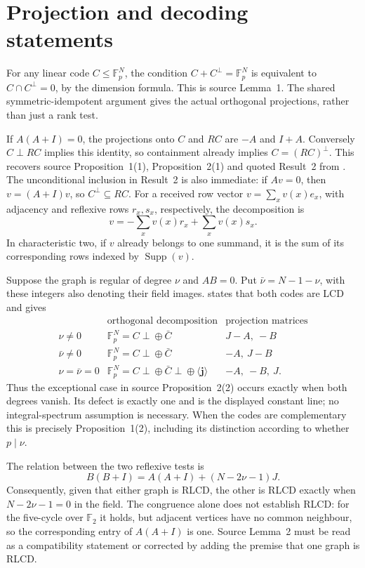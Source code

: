 \section{Projection and decoding statements}
For any linear code $C\leq\mathbb F_p^N$, the condition
$C+C^\perp=\mathbb F_p^N$ is equivalent to $C\cap C^\perp=0$, by the
dimension formula. This is source Lemma~1. The shared symmetric-idempotent
argument gives the actual orthogonal projections, rather than just a
rank test.

If $A(A+I)=0$, the projections onto $C$ and $RC$ are $-A$ and $I+A$.
Conversely $C\perp RC$ implies this identity, so containment already
implies $C=(RC)^\perp$. This recovers source Proposition~1(1),
Proposition~2(1) and quoted Result~2 from .
The unconditional inclusion in Result~2 is also immediate:
if $Av=0$, then $v=(A+I)v$, so $C^\perp\subseteq RC$.
For a received row vector $v=\sum_xv(x)e_x$, with adjacency and reflexive
rows $r_x,s_x$, respectively, the decomposition is
\[
 v=-\sum_xv(x)r_x+\sum_xv(x)s_x.
\]
In characteristic two, if $v$ already belongs to one summand, it is the
sum of its corresponding rows indexed by $\operatorname{Supp}(v)$.

Suppose the graph is regular of degree $\nu$ and $AB=0$.
Put $\bar\nu=N-1-\nu$, with these integers also denoting their field
images.  states that both codes are LCD and gives
\[
\begin{array}{c|c|c}
 &\text{orthogonal decomposition}&\text{projection matrices}\\\hline
\nu\ne0&\mathbb F_p^N=C\perp\!\oplus\bar C&J-A,\ -B\\
\bar\nu\ne0&\mathbb F_p^N=C\perp\!\oplus\bar C&-A,\ J-B\\
\nu=\bar\nu=0&\mathbb F_p^N=C\perp\!\oplus\bar C\perp\!\oplus\langle\mathbf j\rangle
 &-A,\ -B,\ J.
\end{array}
\]
Thus the exceptional case in source Proposition~2(2) occurs exactly when
both degrees vanish. Its defect is exactly one and is the displayed
constant line; no integral-spectrum assumption is necessary. When the
codes are complementary this is precisely Proposition~1(2), including
its distinction according to whether $p\mid\nu$.

The relation between the two reflexive tests is
\begin{equation}\label{eq:two-reflexive}
 B(B+I)=A(A+I)+(N-2\nu-1)J.
\end{equation}
Consequently, given that either graph is RLCD, the other is RLCD exactly
when $N-2\nu-1=0$ in the field. The congruence alone does not establish
RLCD: for the five-cycle over $\mathbb F_2$ it holds, but adjacent
vertices have no common neighbour, so the corresponding entry of
$A(A+I)$ is one. Source Lemma~2 must be read as a compatibility statement
or corrected by adding the premise that one graph is RLCD.

